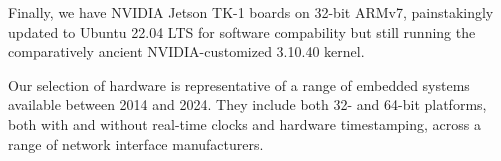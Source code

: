Finally, we have NVIDIA Jetson TK-1 boards on 32-bit ARMv7,
painstakingly updated to Ubuntu 22.04 LTS for software compability but still
running the comparatively ancient NVIDIA-customized 3.10.40 kernel.

Our selection of hardware is representative
of a range of embedded systems available between 2014 and 2024.
They include both 32- and 64-bit platforms,
both with and without real-time clocks and hardware timestamping,
across a range of network interface manufacturers.



